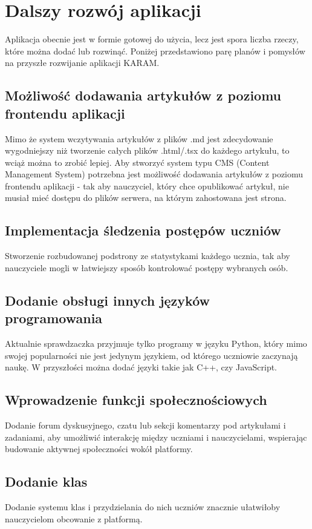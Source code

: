 \documentclass[shortabstract,inz]{iithesis}
\begin{document}
\section{Dalszy rozwój aplikacji}
Aplikacja obecnie jest w formie gotowej do użycia, lecz jest spora liczba rzeczy, które można dodać lub rozwinąć. Poniżej przedstawiono parę planów i pomysłów na przyszłe rozwijanie aplikacji KARAM.

\subsection{Możliwość dodawania artykułów z poziomu frontendu aplikacji}
Mimo że system wczytywania artykułów z plików .md jest zdecydowanie wygodniejszy niż tworzenie całych plików .html/.tsx do każdego artykułu, to wciąż można to zrobić lepiej. Aby stworzyć system typu CMS (Content Management System) \cite{bib:cms} potrzebna jest możliwość dodawania artykułów z poziomu frontendu aplikacji - tak aby nauczyciel, który chce opublikować artykuł, nie musiał mieć dostępu do plików serwera, na którym zahostowana jest strona.

\subsection{Implementacja śledzenia postępów uczniów}
Stworzenie rozbudowanej podstrony ze statystykami każdego ucznia, tak aby nauczyciele mogli w łatwiejszy sposób kontrolować postępy wybranych osób.

\subsection{Dodanie obsługi innych języków programowania}
Aktualnie sprawdzaczka przyjmuje tylko programy w języku Python, który mimo swojej popularności nie jest jedynym językiem, od którego uczniowie zaczynają naukę. W przyszłości można dodać języki takie jak C++, czy JavaScript.

\subsection{Wprowadzenie funkcji społecznościowych}
Dodanie forum dyskusyjnego, czatu lub sekcji komentarzy pod artykułami i zadaniami, aby umożliwić interakcję między uczniami i nauczycielami, wspierając budowanie aktywnej społeczności wokół platformy.

\subsection{Dodanie klas}
Dodanie systemu klas i przydzielania do nich uczniów znacznie ułatwiłoby nauczycielom obcowanie z platformą.
\end{document}
